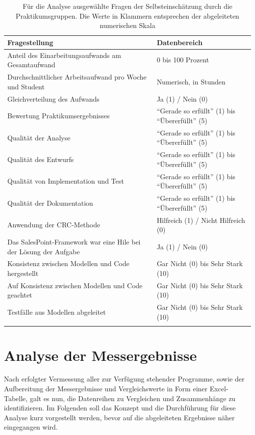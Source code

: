 \documentclass[da,ngerman]{stthesis}
\begin{document}
  				\begin{center}
					\tabulinesep=1.5mm
					\begin{longtabu}{|p{0.4\textwidth}|p{0.5\textwidth}|}
						\hline
  						\textbf{Fragestellung} & \textbf{Datenbereich} \\
  						\hline
    					Anteil des Einarbeitungsaufwands am Gesamtaufwand & 0 bis 100 Prozent\\
    					\hline
    					Durchschnittlicher Arbeitsaufwand pro Woche und Student & Numerisch, in Stunden\\
    					\hline
    					Gleichverteilung des Aufwands & Ja (1) / Nein (0)\\
    					\hline
    					Bewertung Praktikumsergebnisses & "`Gerade so erfüllt"' (1) bis "`Übererfüllt"' (5)\\
    					\hline
    					Qualität der Analyse & "`Gerade so erfüllt"' (1) bis "`Übererfüllt"' (5)\\
    					\hline
    					Qualität des Entwurfs & "`Gerade so erfüllt"' (1) bis "`Übererfüllt"' (5)\\
    					\hline
    					Qualität von Implementation und Test & "`Gerade so erfüllt"' (1) bis "`Übererfüllt"' (5)\\
    					\hline
    					Qualität der Dokumentation & "`Gerade so erfüllt"' (1) bis "`Übererfüllt"' (5)\\
    					\hline
    					Anwendung der CRC-Methode & Hilfreich (1) / Nicht Hilfreich (0)\\
    					\hline
    					Das SalesPoint-Framework war eine Hile bei der Lösung der Aufgabe & Ja (1) / Nein (0)\\
    					\hline
    					Konsistenz zwischen Modellen und Code hergestellt & Gar Nicht (0) bis Sehr Stark (10)\\
    					\hline
    					Auf Konsistenz zwischen Modellen und Code geachtet & Gar Nicht (0) bis Sehr Stark (10)\\
    					\hline
    					Testfälle aus Modellen abgeleitet & Gar Nicht (0) bis Sehr Stark (10)\\
    					\hline
    					\caption{Für die Analyse ausgewählte Fragen der Selbsteinschätzung durch die Praktikumsgruppen. Die Werte in Klammern entsprechen der abgeleiteten numerischen Skala}
						\label{survey} \\
  					\end{longtabu}  
  				\end{center}

  	\chapter{Analyse der Messergebnisse}
  		Nach erfolgter Vermessung aller zur Verfügung stehender Programme, sowie der Aufbereitung der Messergebnisse und Vergleichswerte in Form einer Excel-Tabelle, galt es nun, die Datenreihen zu Vergleichen und Zusammenhänge zu identifizieren. Im Folgenden soll das Konzept und die Durchführung für diese Analyse kurz vorgestellt werden, bevor auf die abgeleiteten Ergebnisse näher eingegangen wird.
\end{document}
